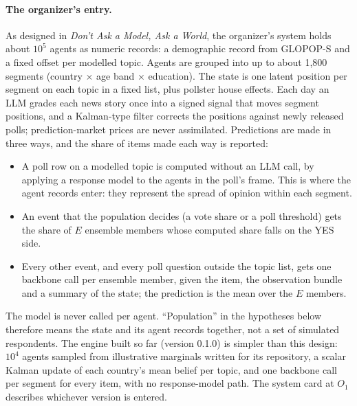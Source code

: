 \documentclass[11pt]{article}
\begin{document}
\paragraph{The organizer's entry.}
\label{sec:system}
As designed in \emph{Don't Ask a Model, Ask a World}, the organizer's system holds about $10^5$ agents as numeric records: a demographic record from GLOPOP-S \citep{ton2024glopop} and a fixed offset per modelled topic. Agents are grouped into up to about 1{,}800 segments (country $\times$ age band $\times$ education). The state is one latent position per segment on each topic in a fixed list, plus pollster house effects. Each day an LLM grades each news story once into a signed signal that moves segment positions, and a Kalman-type filter corrects the positions against newly released polls; prediction-market prices are never assimilated. Predictions are made in three ways, and the share of items made each way is reported:
\begin{itemize}
  \item A poll row on a modelled topic is computed without an LLM call, by applying a response model to the agents in the poll's frame. This is where the agent records enter: they represent the spread of opinion within each segment.
  \item An event that the population decides (a vote share or a poll threshold) gets the share of $E$ ensemble members whose computed share falls on the YES side.
  \item Every other event, and every poll question outside the topic list, gets one backbone call per ensemble member, given the item, the observation bundle and a summary of the state; the prediction is the mean over the $E$ members.
\end{itemize}
The model is never called per agent. ``Population'' in the hypotheses below therefore means the state and its agent records together, not a set of simulated respondents. The engine built so far (version 0.1.0) is simpler than this design: $10^4$ agents sampled from illustrative marginals written for its repository, a scalar Kalman update of each country's mean belief per topic, and one backbone call per segment for every item, with no response-model path. The system card at $O_1$ describes whichever version is entered.
\end{document}
